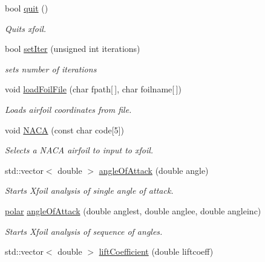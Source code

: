 \begin{DoxyCompactItemize}
\mbox{\label{classXfoilInterface_a7225d1f5817cb79f9f938c8dc616a360}} 
bool \hyperlink{classXfoilInterface_a7225d1f5817cb79f9f938c8dc616a360}{quit} ()
\begin{DoxyCompactList}\small\item\em Quits xfoil. \end{DoxyCompactList}\item 
\mbox{\label{classXfoilInterface_a21659717b7901562e97d25460e8c4f42}} 
bool \hyperlink{classXfoilInterface_a21659717b7901562e97d25460e8c4f42}{set\+Iter} (unsigned int iterations)
\begin{DoxyCompactList}\small\item\em sets number of iterations \end{DoxyCompactList}\item 
void \hyperlink{classXfoilInterface_ae6be41dc3be9e28cd36ed5e9a40b0854}{load\+Foil\+File} (char fpath\mbox{[}$\,$\mbox{]}, char foilname\mbox{[}$\,$\mbox{]})
\begin{DoxyCompactList}\small\item\em Loads airfoil coordinates from file. \end{DoxyCompactList}\item 
void \hyperlink{classXfoilInterface_a202072a14053054a55501c45a296bce7}{N\+A\+CA} (const char code\mbox{[}5\mbox{]})
\begin{DoxyCompactList}\small\item\em Selects a N\+A\+CA airfoil to input to xfoil. \end{DoxyCompactList}\item 
std\+::vector$<$ double $>$ \hyperlink{classXfoilInterface_a7937559afde3fe6880b64b4d8b278256}{angle\+Of\+Attack} (double angle)
\begin{DoxyCompactList}\small\item\em Starts Xfoil analysis of single angle of attack. \end{DoxyCompactList}\item 
\hyperlink{classpolar}{polar} \hyperlink{classXfoilInterface_ac2b547ba157afbb666ddf5f3eff271e2}{angle\+Of\+Attack} (double anglest, double anglee, double angleinc)
\begin{DoxyCompactList}\small\item\em Starts Xfoil analysis of sequence of angles. \end{DoxyCompactList}\item 
std\+::vector$<$ double $>$ \hyperlink{classXfoilInterface_a7dbc26399dc54c42d5e71d0d7cbb2d07}{lift\+Coefficient} (double liftcoeff)

\end{DoxyCompactItemize}

